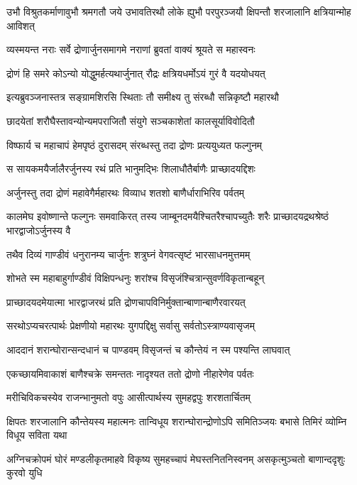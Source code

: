 \threelineshloka
{उभौ विश्रुतकर्माणावुभौ श्रमगतौ जये}
{उभावतिरथौ लोके ह्युभौ परपुरञ्जयौ}
{क्षिपन्तौ शरजालानि क्षत्रियान्मोह आविशत्}


\twolineshloka
{व्यस्मयन्त नराः सर्वे द्रोणार्जुनसमागमे}
{नराणां ब्रुवतां वाक्यं श्रूयते स महास्वनः}


\twolineshloka
{द्रोणं हि समरे कोऽन्यो योद्धुमर्हत्यथार्जुनात्}
{रौद्रः क्षत्रियधर्मोऽयं गुरं वै यदयोधयत्}


\twolineshloka
{इत्यब्रुवञ्जनास्तत्र सङ्ग्रामशिरसि स्थिताः}
{तौ समीक्ष्य तु संरब्धौ सन्निकृष्टौ महारथौ}


\twolineshloka
{छादयेतां शरौघैस्तावन्योन्यमपराजितौ}
{संयुगे सञ्चकाशेतां कालसूर्याविवोदितौ}


\twolineshloka
{विष्फार्य च महाचापं हेमपृष्ठं दुरासदम्}
{संरब्धस्तु तदा द्रोणः प्रत्ययुध्यत फल्गुनम्}


\twolineshloka
{स सायकमयैर्जालैरर्जुनस्य रथं प्रति}
{भानुमद्भिः शिलाधौतैर्बाणैः प्राच्छादयद्दिशः}


\twolineshloka
{अर्जुनस्तु तदा द्रोणं महावेगैर्महारथः}
{विव्याध शतशो बाणैर्धाराभिरिव पर्वतम्}


\onelineshloka
{कालमेघ इवोष्णान्ते फल्गुनः समवाकिरत्}
\twolineshloka
{तस्य जाम्बूनदमयैश्चितरैश्चापच्युतैः शरैः}
{प्राच्छादयद्रथश्रेष्ठं भारद्वाजोऽर्जुनस्य वै}


\twolineshloka
{तथैव दिव्यं गाण्डीवं धनुरानम्य चार्जुनः}
{शत्रुघ्नं वेगवत्सृष्टं भारसाधनमुत्तमम्}


\twolineshloka
{शोभते स्म महाबाहुर्गाण्डीवं विक्षिपन्धनुः}
{शरांश्च विसृजंश्चित्रान्सुवर्णविकृतान्बहून्}


\twolineshloka
{प्राच्छादयदमेयात्मा भारद्वाजरथं प्रति}
{द्रोणचापविनिर्मुक्तान्बाणान्बाणैरवारयत्}


\twolineshloka
{सरथोऽप्यचरत्पार्थः प्रेक्षणीयो महारथः}
{युगपद्दिक्षु सर्वासु सर्वतोऽस्त्राण्यवासृजम्}


\twolineshloka
{आददानं शरान्घोरान्सन्दधानं च पाण्डवम्}
{विसृजन्तं च कौन्तेयं न स्म पश्यन्ति लाघवात्}


\twolineshloka
{एकच्छायमिवाकाशं बाणैश्चक्रे समन्ततः}
{नादृश्यत ततो द्रोणो नीहारेणेव पर्वतः}


\twolineshloka
{मरीचिविकचस्येव राजन्भानुमतो वपुः}
{आसीत्पार्थस्य सुमहद्वपुः शरशतार्चितम्}


\threelineshloka
{क्षिपतः शरजालानि कौन्तेयस्य महात्मनः}
{तान्विधूय शरान्घोरान्द्रोणोऽपि समितिञ्जयः}
{बभासे तिमिरं व्योम्नि विधूय सविता यथा}


\threelineshloka
{अग्निचक्रोपमं घोरं मण्डलीकृतमाहवे}
{विकृष्य सुमहच्चापं मेघस्तनितनिस्वनम्}
{असकृत्मुञ्चतो बाणान्ददृशुः कुरवो युधि}


